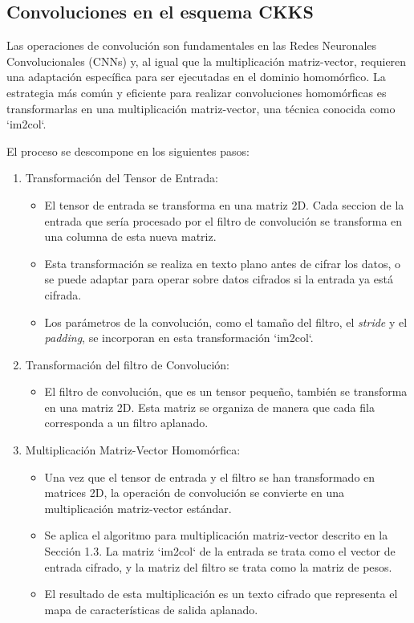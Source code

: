\subsection{Convoluciones en el esquema CKKS}

Las operaciones de convolución son fundamentales en las Redes Neuronales Convolucionales (CNNs) y, al igual que la multiplicación matriz-vector, requieren una adaptación específica para ser ejecutadas en el dominio homomórfico. La estrategia más común y eficiente para realizar convoluciones homomórficas es transformarlas en una multiplicación matriz-vector, una técnica conocida como `im2col`.

El proceso se descompone en los siguientes pasos:

\begin{enumerate}
    \item Transformación del Tensor de Entrada:
    \begin{itemize}
        \item El tensor de entrada se transforma en una matriz 2D. Cada seccion de la entrada que sería procesado por el filtro de convolución se transforma en una columna de esta nueva matriz.
        \item Esta transformación se realiza en texto plano antes de cifrar los datos, o se puede adaptar para operar sobre datos cifrados si la entrada ya está cifrada.
        \item Los parámetros de la convolución, como el tamaño del filtro, el \textit{stride} y el \textit{padding}, se incorporan en esta transformación `im2col`.
    \end{itemize}

    \item Transformación del filtro de Convolución:
    \begin{itemize}
        \item El filtro de convolución, que es un tensor pequeño, también se transforma en una matriz 2D. Esta matriz se organiza de manera que cada fila corresponda a un filtro aplanado.
    \end{itemize}

    \item Multiplicación Matriz-Vector Homomórfica:
    \begin{itemize}
        \item Una vez que el tensor de entrada y el filtro se han transformado en matrices 2D, la operación de convolución se convierte en una multiplicación matriz-vector estándar.
        \item Se aplica el algoritmo para multiplicación matriz-vector descrito en la Sección 1.3. La matriz `im2col` de la entrada se trata como el vector de entrada cifrado, y la matriz del filtro se trata como la matriz de pesos.
        \item El resultado de esta multiplicación es un texto cifrado que representa el mapa de características de salida aplanado.
    \end{itemize}
\end{enumerate}

